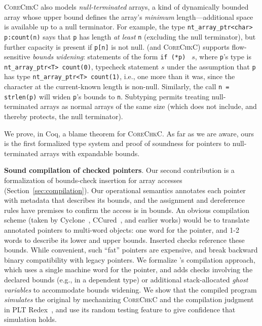 \documentclass[conference]{IEEEtran}
\newcommand{\myparagraph}[1]{\textbf{#1}.\xspace}
\newcommand{\lang}{\textsc{CoreChkC}\xspace}
\newcommand{\checkedc}{\text{Checked C}\xspace}
\begin{document}
\lang also models
\emph{null-terminated} arrays, a kind of dynamically bounded array whose upper bound 
defines the array's \emph{minimum} length---additional space is available 
up to a null terminator. For example, the \checkedc type
\lstinline{nt_array_ptr<char> p:count(n)} says that
\lstinline{p} has length \emph{at least} \lstinline{n} (excluding the
null terminator), but further capacity is present if \lstinline|p[n]| is not null. \checkedc (and \lang) supports flow-sensitive
\emph{bounds widening}: statements of the form \lstinline|if (*p) | $s$,
where \lstinline{p}'s type is \lstinline{nt_array_ptr<T> count(0)},
typecheck statement $s$ under the assumption that \lstinline{p} has
type \lstinline{nt_array_ptr<T> count(1)}, 
 i.e., one more than it was,
since the character at the current-known length is
non-null. Similarly, the call \lstinline|n = strlen(p)| will widen
\lstinline|p|'s bounds to \lstinline|n|. Subtyping permits treating
null-terminated arrays as normal arrays of the same size (which
does not include, and thereby protects, the null terminator).

We prove, in Coq, a blame theorem for \lang.  As far as we are aware,
ours is the first formalized type system and proof of soundness for
pointers to null-terminated arrays with expandable bounds.



\myparagraph{Sound compilation of checked pointers} Our second
contribution is a formalization of bounds-check insertion for array
accesses (Section~\ref{sec:compilation}). Our operational semantics
annotates each pointer with metadata that describes its bounds, and
the assignment and dereference rules have premises to confirm the
access is in bounds. An obvious compilation scheme (taken by
Cyclone~\cite{Jim2002,GrossmanMJHWC02}, CCured~\cite{Necula2005}, and
earlier works) would be to translate annotated pointers to multi-word
objects: one word for the pointer, and 1-2 words to describe its lower
and upper bounds. Inserted checks reference these bounds. While
convenient, such ``fat'' pointers are expensive, and break backward
binary compatibility with legacy pointers. We formalize \checkedc's
compilation approach, which uses a single machine word for the
pointer, and adds checks involving the declared bounds (e.g., in a
dependent type) or additional stack-allocated \emph{ghost variables}
to accommodate bounds widening. We show that the compiled program
\emph{simulates} the original by mechanizing \lang and the compilation
judgment in PLT Redex~\cite{pltredex}, and use its random testing
feature to give confidence that simulation holds.
\end{document}
